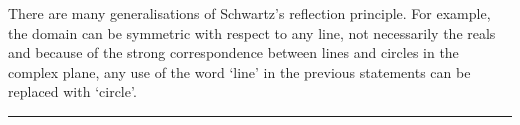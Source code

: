 There are many generalisations of Schwartz's reflection principle. For example, the domain can be symmetric with respect to any line, not necessarily the reals and because of the strong correspondence between lines and circles in the complex plane, any use of the word `line' in the previous statements can be replaced with `circle'.

\begin{center}
    \noindent\rule{2cm}{0.4pt}
\end{center}